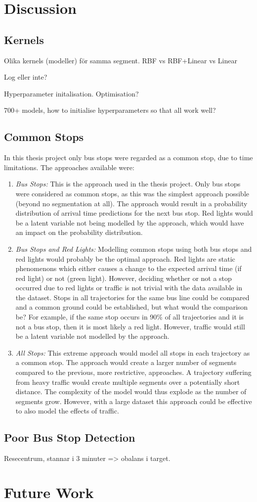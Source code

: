 \section{Discussion}

\subsection{Kernels}
Olika kernels (modeller) för samma segment.
RBF vs RBF+Linear vs Linear

Log eller inte?

Hyperparameter initalisation.
Optimisation?

700+ models, how to initialise hyperparameters so that all work well?

\subsection{Common Stops}
In this thesis project only bus stops were regarded as a common stop, due to time limitations.
The approaches available were:
\begin{enumerate}
    \item \textit{Bus Stops:} 
    This is the approach used in the thesis project.
    Only bus stops were considered as common stops, as this was the simplest approach possible (beyond no segmentation at all).
    The approach would result in a probability distribution of arrival time predictions for the next bus stop.
    Red lights would be a latent variable not being modelled by the approach, which would have an impact on the probability distribution.
    \item \textit{Bus Stops and Red Lights:}
    Modelling common stops using both bus stops and red lights would probably be the optimal approach.
    Red lights are static phenomenons which either causes a change to the expected arrival time (if red light) or not (green light).
    However, deciding whether or not a stop occurred due to red lights or traffic is not trivial with the data available in the dataset.
    Stops in all trajectories for the same bus line could be compared and a common ground could be established, but what would the comparison be?
    For example, if the same stop occurs in 90\% of all trajectories and it is not a bus stop, then it is most likely a red light.
    However, traffic would still be a latent variable not modelled by the approach.
    \item \textit{All Stops:}
    This extreme approach would model all stops in each trajectory as a common stop.
    The approach would create a larger number of segments compared to the previous, more restrictive, approaches.
    A trajectory suffering from heavy traffic would create multiple segments over a potentially short distance.
    The complexity of the model would thus explode as the number of segments grow.
    However, with a large dataset this approach could be effective to also model the effects of traffic.
\end{enumerate} 

\subsection{Poor Bus Stop Detection}
Resecentrum, stannar i 3 minuter => obalans i target.

\section{Future Work}
